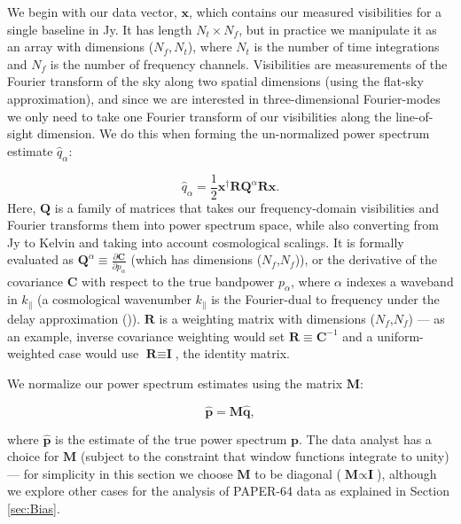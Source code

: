 \documentclass[preprint2,numberedappendix,tighten]{aastex6}  %
\begin{document}
We begin with our data vector, $\textbf{x}$, which contains our measured visibilities for a single baseline in Jy. It has length $N_{t} \times N_{f}$, but in practice we manipulate it as an array with dimensions ($N_{f}, N_{t}$), where 
$N_{t}$ is the number of time integrations and $N_{f}$ is the number of frequency channels. Visibilities are measurements of 
the Fourier transform of the sky along two spatial dimensions (using the flat-sky approximation), and since we are interested in three-dimensional Fourier-modes 
we only need to take one Fourier transform of our visibilities along the line-of-sight dimension. We do this when forming the un-normalized power spectrum estimate $\widehat{q}_{\alpha}$:

\begin{equation}
\label{eq:qhat}
\widehat{q}_{\alpha} = \frac{1}{2}\textbf{x}^{\dagger}\textbf{R}\textbf{Q}^{\alpha}\textbf{R}\textbf{x}.
\end{equation}
Here, \noindent $\textbf{Q}$ is a family of matrices that takes our frequency-domain visibilities and Fourier transforms them into 
power spectrum space, while also converting from Jy to 
Kelvin and taking into account cosmological scalings. It is formally evaluated as $\textbf{Q}^{\alpha} \equiv \frac{\partial\textbf{C}}{\partial p_{\alpha}}$ (which has dimensions ($N_{f}$,$N_{f}$)), or the derivative of the covariance $\textbf{C}$ with respect to the true bandpower $p_\alpha$, where $\alpha$ indexes a waveband in $k_{\parallel}$ (a cosmological wavenumber $k_{\parallel}$ is the 
Fourier-dual to frequency under the delay approximation (\citealt{parsons_et_al2012b})). $\textbf{R}$ is a weighting matrix with dimensions ($N_{f}$,$N_{f}$) --- as 
an example, inverse covariance weighting would set $\textbf{R} \equiv \textbf{C}^{-1}$ and a uniform-weighted case would use $
\textbf{R} \equiv \textbf{I}$, the identity matrix.

We normalize our power spectrum estimates using the matrix $\textbf{M}$:

\begin{equation}
\label{eq:phat}
\widehat{\textbf{p}} = \textbf{M}\widehat{\textbf{q}},
\end{equation}

\noindent where $\widehat{\textbf{p}}$ is the estimate of the true power spectrum $\textbf{p}$. The data analyst has a choice for $
\textbf{M}$ (subject to the constraint that window functions integrate to unity) --- for simplicity in this section we choose $\textbf{M}$ to be diagonal ($\textbf{M} \propto \textbf{I}$), although we explore other cases for the analysis 
of PAPER-64 data as explained in Section \ref{sec:Bias}.
\end{document}
